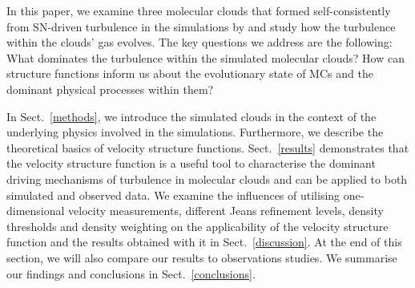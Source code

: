 In this paper, we examine three molecular clouds that formed self-consistently from SN-driven turbulence in the simulations by \citet[ and  hereafter]{IbanezMejia2016,IbanezMejia2017} and study how the turbulence within the clouds' gas evolves.
The key questions we address are the following: 
What dominates the turbulence within the simulated molecular clouds? 
How can structure functions inform us about the evolutionary state of MCs and the dominant physical processes within them?

In Sect.~\ref{methods}, we introduce the simulated clouds in the context of the underlying physics involved in the simulations.
Furthermore, we describe the theoretical basics of velocity structure functions.
Sect.~\ref{results} demonstrates that the velocity structure function is a useful tool to characterise the dominant driving mechanisms of turbulence in molecular clouds and can be applied to both simulated and observed data. 
We examine the influences of utilising one-dimensional velocity measurements, different Jeans refinement levels, density thresholds and density weighting on the applicability of the velocity structure function and the results obtained with it in Sect.~\ref{discussion}.  
At the end of this section, we will also compare our results to observations studies.
We summarise our findings and conclusions in Sect.~\ref{conclusions}.



\endinput
